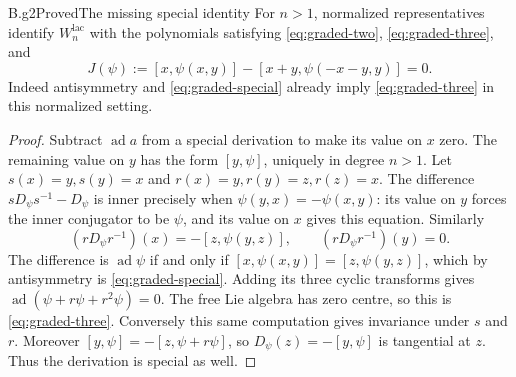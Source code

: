 \begin{claim}{B.g2}{Proved}{The missing special identity}
For $n>1$, normalized representatives identify $W^{\mathrm{lac}}_n$
with the polynomials satisfying \eqref{eq:graded-two},
\eqref{eq:graded-three}, and
\begin{equation}
 J(\psi):=[x,\psi(x,y)]-[x+y,\psi(-x-y,y)]=0.
 \label{eq:graded-special}
\end{equation}
Indeed antisymmetry and \eqref{eq:graded-special} already imply
\eqref{eq:graded-three} in this normalized setting.
\end{claim}

\begin{proof}
Subtract $\operatorname{ad}a$ from a special derivation to make its
value on $x$ zero.  The remaining value on $y$ has the form
$[y,\psi]$, uniquely in degree $n>1$.
Let $s(x)=y,s(y)=x$ and $r(x)=y,r(y)=z,r(z)=x$.
The difference $sD_\psi s^{-1}-D_\psi$ is inner precisely when
$\psi(y,x)=-\psi(x,y)$: its value on $y$ forces the inner conjugator
to be $\psi$, and its value on $x$ gives this equation.
Similarly
\[
 (rD_\psi r^{-1})(x)=-[z,\psi(y,z)],\qquad
 (rD_\psi r^{-1})(y)=0.
\]
The difference is $\operatorname{ad}\psi$ if and only if
$[x,\psi(x,y)]=[z,\psi(y,z)]$, which by antisymmetry is
\eqref{eq:graded-special}.  Adding its three cyclic transforms gives
$\operatorname{ad}(\psi+r\psi+r^2\psi)=0$.
The free Lie algebra has zero centre, so this is
\eqref{eq:graded-three}.
Conversely this same computation gives invariance under $s$ and $r$.
Moreover
$[y,\psi]=-[z,\psi+r\psi]$, so $D_\psi(z)=-[y,\psi]$
is tangential at $z$.  Thus the derivation is special as well.
\end{proof}

